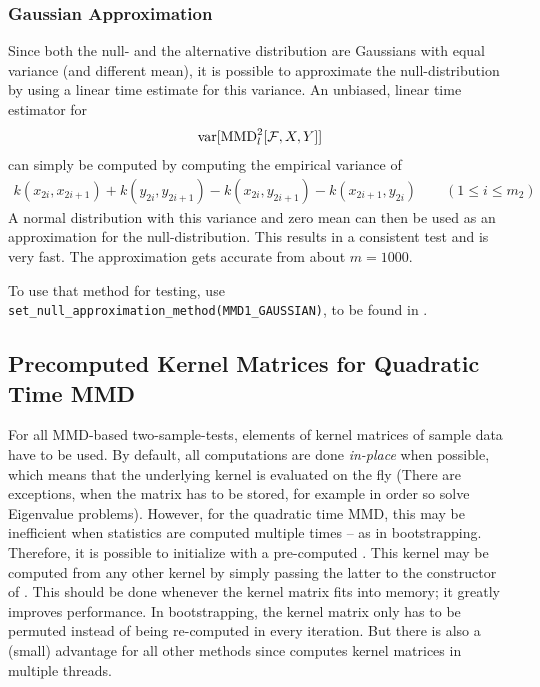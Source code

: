 \subsubsection{Gaussian Approximation}
Since both the null- and the alternative distribution are Gaussians with equal variance (and different mean), it is possible to approximate the null-distribution by using a linear time estimate for this variance. An unbiased, linear time estimator for
\begin{align*}
\operatorname{var}[\operatorname{MMD}_l^2[\mathcal{F},X,Y]]
\end{align*}
can simply be computed by computing the empirical variance of
\begin{align*}
k(x_{2i},x_{2i+1})+k(y_{2i},y_{2i+1})-k(x_{2i},y_{2i+1})-k(x_{2i+1},y_{2i}) \qquad (1\leq i\leq m_2)
\end{align*}
A normal distribution with this variance and zero mean can then be used as an approximation for the null-distribution. This results in a consistent test and is very fast. The approximation gets accurate from about $m=1000$.

To use that method for testing, use \texttt{set\_null\_approximation\_method(MMD1\_GAUSSIAN)}, to be found in .

\subsection{Precomputed Kernel Matrices for Quadratic Time MMD}
\label{sec:quadratic_mmd_precomputed_kernel}
For all MMD-based two-sample-tests, elements of kernel matrices of sample data have to be used. By default, all computations are done \emph{in-place} when possible, which means that the underlying kernel is evaluated on the fly (There are exceptions, when the matrix has to be stored, for example in order so solve Eigenvalue problems). However, for the quadratic time MMD, this may be inefficient when statistics are computed multiple times -- as in bootstrapping. Therefore, it is possible to initialize  with a pre-computed . This kernel may be computed from any other kernel by simply passing the latter to the constructor of . This should be done whenever the kernel matrix fits into memory; it greatly improves performance. In bootstrapping, the kernel matrix only has to be permuted instead of being re-computed in every iteration. But there is also a (small) advantage for all other methods since \shogun{} computes kernel matrices in multiple threads.


